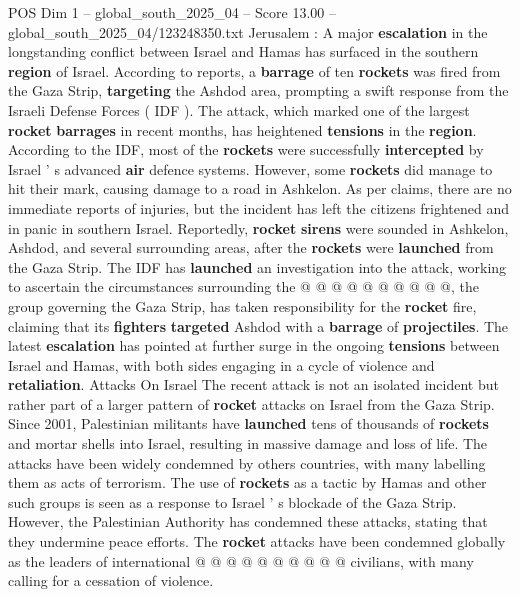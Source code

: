 \begin{textsample}{POS Dim 1 – global\_south\_2025\_04 – Score 13.00 – global\_south\_2025\_04/123248350.txt}  \label{ex:f1_pos_324}
Jerusalem : A major \textbf{escalation} in the longstanding conflict between Israel and Hamas has surfaced in the southern \textbf{region} of Israel.
According to reports, a \textbf{barrage} of ten \textbf{rockets} was fired from the Gaza Strip, \textbf{targeting} the Ashdod area, prompting a swift response from the Israeli Defense Forces ( IDF ).
The attack, which marked one of the largest \textbf{rocket} \textbf{barrages} in recent months, has heightened \textbf{tensions} in the \textbf{region}.
According to the IDF, most of the \textbf{rockets} were successfully \textbf{intercepted} by Israel ' s advanced \textbf{air} defence systems.
However, some \textbf{rockets} did manage to hit their mark, causing damage to a road in Ashkelon.
As per claims, there are no immediate reports of injuries, but the incident has left the citizens frightened and in panic in southern Israel.
Reportedly, \textbf{rocket} \textbf{sirens} were sounded in Ashkelon, Ashdod, and several surrounding areas, after the \textbf{rockets} were \textbf{launched} from the Gaza Strip.
The IDF has \textbf{launched} an investigation into the attack, working to ascertain the circumstances surrounding the @ @ @ @ @ @ @ @ @ @, the group governing the Gaza Strip, has taken responsibility for the \textbf{rocket} fire, claiming that its \textbf{fighters} \textbf{targeted} Ashdod with a \textbf{barrage} of \textbf{projectiles}.
The latest \textbf{escalation} has pointed at further surge in the ongoing \textbf{tensions} between Israel and Hamas, with both sides engaging in a cycle of violence and \textbf{retaliation}.
Attacks On Israel The recent attack is not an isolated incident but rather part of a larger pattern of \textbf{rocket} attacks on Israel from the Gaza Strip.
Since 2001, Palestinian militants have \textbf{launched} tens of thousands of \textbf{rockets} and mortar shells into Israel, resulting in massive damage and loss of life.
The attacks have been widely condemned by others countries, with many labelling them as acts of terrorism.
The use of \textbf{rockets} as a tactic by Hamas and other such groups is seen as a response to Israel ' s blockade of the Gaza Strip.
However, the Palestinian Authority has condemned these attacks, stating that they undermine peace efforts.
The \textbf{rocket} attacks have been condemned globally as the leaders of international @ @ @ @ @ @ @ @ @ @ civilians, with many calling for a cessation of violence.

\end{textsample}
